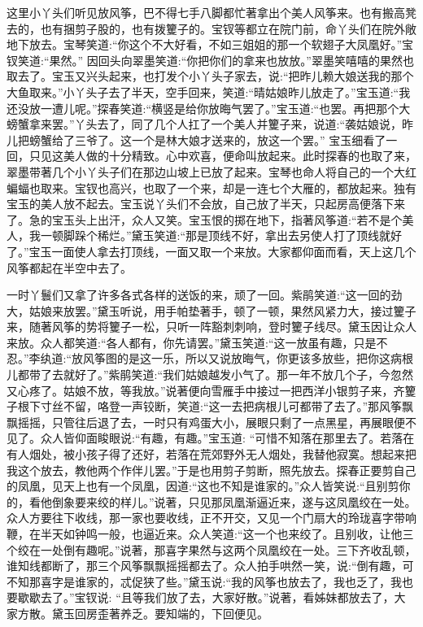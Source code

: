 \begin{parag}
    这里小丫头们听见放风筝，巴不得七手八脚都忙著拿出个美人风筝来。也有搬高凳去的，也有捆剪子股的，也有拨籰子的。宝钗等都立在院门前，命丫头们在院外敞地下放去。宝琴笑道:“你这个不大好看，不如三姐姐的那一个软翅子大凤凰好。”宝钗笑道:“果然。” 因回头向翠墨笑道:“你把你们的拿来也放放。”翠墨笑嘻嘻的果然也取去了。宝玉又兴头起来，也打发个小丫头子家去，说:“把昨儿赖大娘送我的那个大鱼取来。”小丫头子去了半天，空手回来，笑道:“晴姑娘昨儿放走了。”宝玉道:“我还没放一遭儿呢。”探春笑道:“横竖是给你放晦气罢了。”宝玉道:“也罢。再把那个大螃蟹拿来罢。”丫头去了，同了几个人扛了一个美人并籰子来，说道:“袭姑娘说，昨儿把螃蟹给了三爷了。这一个是林大娘才送来的，放这一个罢。” 宝玉细看了一回，只见这美人做的十分精致。心中欢喜，便命叫放起来。此时探春的也取了来，翠墨带著几个小丫头子们在那边山坡上已放了起来。宝琴也命人将自己的一个大红蝙蝠也取来。宝钗也高兴，也取了一个来，却是一连七个大雁的，都放起来。独有宝玉的美人放不起去。宝玉说丫头们不会放，自己放了半天，只起房高便落下来了。急的宝玉头上出汗，众人又笑。宝玉恨的掷在地下，指著风筝道:“若不是个美人，我一顿脚跺个稀烂。”黛玉笑道:“那是顶线不好，拿出去另使人打了顶线就好了。”宝玉一面使人拿去打顶线，一面又取一个来放。大家都仰面而看，天上这几个风筝都起在半空中去了。
\end{parag}


\begin{parag}
    一时丫鬟们又拿了许多各式各样的送饭的来，顽了一回。紫鹃笑道:“这一回的劲大，姑娘来放罢。”黛玉听说，用手帕垫著手，顿了一顿，果然风紧力大，接过籰子来，随著风筝的势将籰子一松，只听一阵豁刺刺响，登时籰子线尽。黛玉因让众人来放。众人都笑道:“各人都有，你先请罢。”黛玉笑道:“这一放虽有趣，只是不忍。”李纨道:“放风筝图的是这一乐，所以又说放晦气，你更该多放些，把你这病根儿都带了去就好了。”紫鹃笑道:“我们姑娘越发小气了。那一年不放几个子，今忽然又心疼了。姑娘不放，等我放。”说著便向雪雁手中接过一把西洋小银剪子来，齐籰子根下寸丝不留，咯登一声铰断，笑道:“这一去把病根儿可都带了去了。”那风筝飘飘摇摇，只管往后退了去，一时只有鸡蛋大小，展眼只剩了一点黑星，再展眼便不见了。众人皆仰面睃眼说:“有趣，有趣。”宝玉道: “可惜不知落在那里去了。若落在有人烟处，被小孩子得了还好，若落在荒郊野外无人烟处，我替他寂寞。想起来把我这个放去，教他两个作伴儿罢。”于是也用剪子剪断，照先放去。探春正要剪自己的凤凰，见天上也有一个凤凰，因道:“这也不知是谁家的。”众人皆笑说:“且别剪你的，看他倒象要来绞的样儿。”说著，只见那凤凰渐逼近来，遂与这凤凰绞在一处。众人方要往下收线，那一家也要收线，正不开交，又见一个门扇大的玲珑喜字带响鞭，在半天如钟鸣一般，也逼近来。众人笑道:“这一个也来绞了。且别收，让他三个绞在一处倒有趣呢。”说著，那喜字果然与这两个凤凰绞在一处。三下齐收乱顿，谁知线都断了，那三个风筝飘飘摇摇都去了。众人拍手哄然一笑，说:“倒有趣，可不知那喜字是谁家的，忒促狭了些。”黛玉说:“我的风筝也放去了，我也乏了，我也要歇歇去了。”宝钗说: “且等我们放了去，大家好散。”说著，看姊妹都放去了，大家方散。黛玉回房歪著养乏。要知端的，下回便见。
\end{parag}


